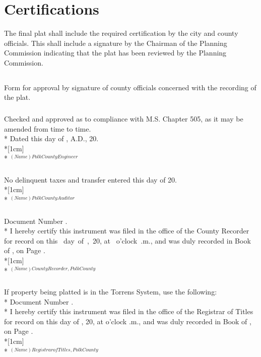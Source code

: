 \section{Certifications}
The final plat shall include the required certification by the city and county officials. This shall include a signature by the Chairman of the Planning Commission indicating that the plat has been reviewed by the Planning Commission.
\subsection{}
Form for approval by signature of county officials concerned with the recording of the plat.
\subsubsection{}
Checked and approved as to compliance with M.S. Chapter 505, as it may be amended from time to time.\\*
Dated this \fillable{1cm} day of \fillable{2cm}, A.D.,  20\fillable{1cm}.\\*[1cm]
\fillable{5cm}\\*
$^{(Name) Polk County Engineer}$
\subsubsection{}
No delinquent taxes and transfer entered this \fillable{1cm} day of \fillable{2cm} 20\fillable{1cm}.\\*[1cm]
\fillable{5cm}\\*
$^{(Name) Polk County Auditor}$
\subsubsection{}
Document Number \fillable{2cm}.\\*
I hereby certify this instrument was filed in the office of the County Recorder for record on this \mbox{\fillable{1cm} day of \fillable{2cm},  20\fillable{1cm},} at \mbox{\fillable{1cm} o’clock \fillable{1cm}.m.,} and was duly recorded in Book \fillable{2cm} of \fillable{2cm}, on Page \fillable{1cm}.\\*[1cm]
\fillable{5cm}\\*
$^{(Name) County Recorder, Polk County}$
\subsubsection{}
If property being platted is in the Torrens System, use the following:\\*
Document Number \fillable{2cm}.\\*
I hereby certify this instrument was filed in the office of the Registrar of Titles for record on this \fillable{1cm} day of \fillable{2cm}, 20\fillable{1cm}, at \fillable{1cm} o’clock \fillable{1cm}.m., and was duly recorded in Book \fillable{2cm} of \fillable{2cm}, on Page \fillable{1cm}.\\*[1cm]
\fillable{5cm}\\*
$^{(Name) Registrar of Titles, Polk County}$
